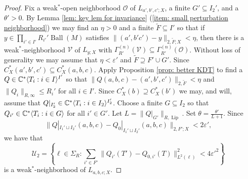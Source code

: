 \documentclass[10pt,a4paper]{amsart}
\DeclareMathOperator{\Ball}{Ball}
\DeclareMathOperator{\Lip}{Lip}
\DeclarePairedDelimiter{\ip}{\langle}{\rangle}
\newcommand{\bC}{{\mathbb C}}
\newcommand{\cU}{{\mathcal U}}
\begin{document}
\begin{proof}
  Fix a weak$^{*}$-open neighborhood $\mathcal{O}$ of $L_{a',b',c';X}$, a finite $G'\subseteq I_{2}'$, and a $\theta'>0$. By Lemma \ref{lem: key lem for invariance} (\ref{item: small perturbation neighborhood}) we may find an $\eta>0$ and a finite $\widetilde{F}\subseteq I'$ so that if $y\in \prod_{i'\in I'}R_{i'}'\Ball(M)$ satisfies $\|(a',b'c')-y\|_{2,\widetilde{F};X}<\eta$, then there is a weak$^{*}$-neighborhood $\mathcal{V}$ of $L_{y;X}$ with $\Gamma^{(n)}_{R'}(\mathcal{V})\subseteq \Gamma^{(n)}_{R'}(\mathcal{O})$.
Without loss of generality we may assume that $\eta<\varepsilon'$ and $\widetilde{F}\supseteq F'\cup G'$.  Since $C^{*}_{X}(a',b',c')\subseteq C^{*}_{X}(a,b,c)$. Apply Proposition \ref{prop: better KDT} to find a $Q\in \bC^{*}\ip{T_{i}:i\in I}^{I'}$ so that $\|Q(a,b,c)-(a',b',c')\|_{2,\widetilde{F}}<\eta$ and $\|Q_{i}\|_{R,\infty}\leq R_{i}'$ for all $i\in I'$.
Since $C^{*}_{X}(b)\supseteq C^{*}_{X}(b')$ we may, and will, assume that $Q|_{I_{2}'}\in \bC^{*}\ip{T_{i}:i\in I_{2}}^{I_{2}'}$. Choose a finite $G\subseteq I_{2}$ so that $Q_{i'}\in \bC^{*}\ip{T_{i}:i\in G}$ for all $i'\in G'$. Let $L=\|Q|_{G'}\|_{R,\Lip}$. Set  $\theta=\frac{\theta'}{L+1}$. Since 
\[\|Q|_{I_{1}'\sqcup I_{2}'}(a,b,c)-Q_{0}|_{I_{1}'\sqcup I_{2}'}(a,b,c)\|_{2,F';X}<2\varepsilon',\]
we have that 
\[\cU_{2}=\left\{\ell\in \Sigma_{R}:\sum_{i'\in F'}\|Q_{i'}(T')-Q_{0,i'}(T)\|_{L^{2}(\ell)}^{2}<4\varepsilon'^{2}\right\}\]
is a weak$^{*}$-neighborhood of $L_{a,b,c;X}$. 


\end{proof}
\end{document}
